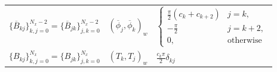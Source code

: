 \documentclass[11pt, oneside]{elsarticle}
\newcommand{\D}[1]{\overline{#1}}
\begin{document}
\begin{table}
\begin{tabular}{ccl}
$\{\D{B}_{kj}\}_{k,j=0}^{N_x-2} = \{\D{B}_{jk}\}_{j,k=0}^{N_x-2}$ & $(\D{\phi}_j, \D{\phi}_k)_w$ & $ \begin{cases} 
\frac{\pi}{2} (c_k+c_{k+2}) &j=k, \\
-\frac{\pi}{2} &j=k + 2, \\
0, &\text{otherwise}
\end{cases}$ \\

$\{B_{kj}\}_{k,j=0}^{N_x} = \{B_{jk}\}_{j,k=0}^{N_x}$ & $(T_k, T_j)_w$ & $\frac{c_k \pi}{2} \delta_{kj}$

	\end{tabular}
\end{table}
\end{document}
